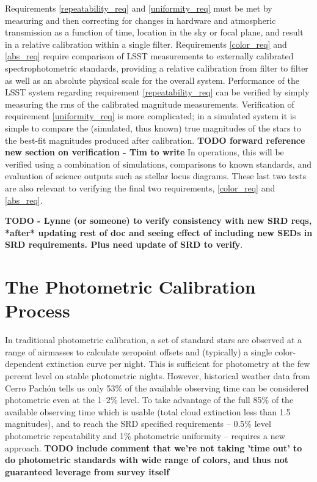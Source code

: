 \documentclass[12pt,preprint]{aastex}
\begin{document}
Requirements \ref{repeatability_req} and \ref{uniformity_req} must be
met by measuring and then correcting for changes in hardware and
atmospheric transmission as a function of time, location in the sky or
focal plane, and result in a relative calibration within a single
filter. Requirements \ref{color_req} and \ref{abs_req} require
comparison of LSST measurements to externally calibrated
spectrophotometric standards, providing a relative calibration from
filter to filter as well as an absolute physical scale for the overall
system.  Performance of the LSST system regarding requirement
\ref{repeatability_req} can be verified by simply measuring the rms of
the calibrated magnitude measurements. Verification of requirement
\ref{uniformity_req} is more complicated; in a simulated system it is
simple to compare the (simulated, thus known) true magnitudes of the
stars to the best-fit magnitudes produced after calibration. {\bf TODO forward reference new section on verification - Tim to write} 
In operations, this will be verified using a combination of simulations,
comparisons to known standards, and evaluation of science outputs such
as stellar locus diagrams. These last two tests are also relevant to
verifying the final two requirements, \ref{color_req} and
\ref{abs_req}.

{\bf TODO - Lynne (or someone) to verify consistency with new SRD reqs, *after* updating rest of doc and seeing effect of including new SEDs in SRD requirements. Plus need update of SRD to verify}. 


\section{The Photometric Calibration Process}
\label{sec:calib_overview}

In traditional photometric calibration, a set of standard stars are
observed at a range of airmasses to calculate zeropoint offsets and
(typically) a single color-dependent extinction curve per night. This is
sufficient for photometry at the few percent level on stable photometric
nights. However, historical weather data from Cerro Pach\'{o}n tells us
only 53\% of the available observing time can be considered
photometric even at the 1--2\% level. To take advantage of the full
85\% of the available observing time which is usable (total cloud
extinction less than 1.5 magnitudes), and to reach the SRD specified
requirements -- 0.5\% level photometric repeatability and 1\%
photometric uniformity -- requires a new approach.
{\bf TODO include comment that we're not taking 'time out' to do photometric standards with wide range of colors, and thus not guaranteed leverage from survey itself}
\end{document}
